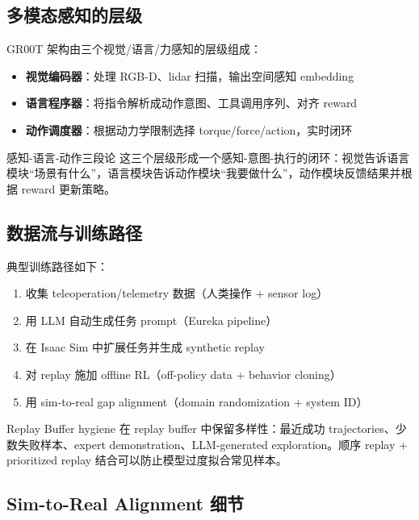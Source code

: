 \documentclass[a4paper]{article}
\begin{document}
\subsection{多模态感知的层级}

GR00T 架构由三个视觉/语言/力感知的层级组成：

\begin{itemize}
    \item \textbf{视觉编码器}：处理 RGB-D、lidar 扫描，输出空间感知 embedding
    \item \textbf{语言程序器}：将指令解析成动作意图、工具调用序列、对齐 reward
    \item \textbf{动作调度器}：根据动力学限制选择 torque/force/action，实时闭环
\end{itemize}

\begin{knowledgebox}{感知-语言-动作三段论}
这三个层级形成一个感知-意图-执行的闭环：视觉告诉语言模块“场景有什么”，语言模块告诉动作模块“我要做什么”，动作模块反馈结果并根据 reward 更新策略。
\end{knowledgebox}

\subsection{数据流与训练路径}

典型训练路径如下：

\begin{enumerate}
    \item 收集 teleoperation/telemetry 数据（人类操作 + sensor log）
    \item 用 LLM 自动生成任务 prompt（Eureka pipeline）
    \item 在 Isaac Sim 中扩展任务并生成 synthetic replay
    \item 对 replay 施加 offline RL（off-policy data + behavior cloning）
    \item 用 sim-to-real gap alignment（domain randomization + system ID）
\end{enumerate}

\begin{importantbox}{Replay Buffer hygiene}
在 replay buffer 中保留多样性：最近成功 trajectories、少数失败样本、expert demonstration、LLM-generated exploration。顺序 replay + prioritized replay 结合可以防止模型过度拟合常见样本。
\end{importantbox}

\subsection{Sim-to-Real Alignment 细节}
\end{document}
